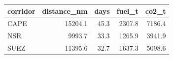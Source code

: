 \begin{tabular}{lrrrr}
\toprule
corridor &  distance\_nm &  days &  fuel\_t &  co2\_t \\
\midrule
    CAPE &      15204.1 &  45.3 &  2307.8 & 7186.4 \\
     NSR &       9993.7 &  33.3 &  1265.9 & 3941.9 \\
    SUEZ &      11395.6 &  32.7 &  1637.3 & 5098.6 \\
\bottomrule
\end{tabular}

